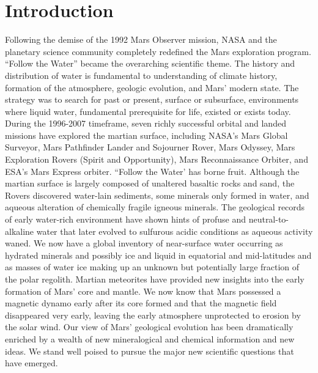 \chapter*{Introduction}

Following the demise of the 1992 Mars Observer mission,
NASA and the planetary science community completely redefined
the Mars exploration program. ``Follow the Water''
became the overarching scientific theme. The history and distribution
of water is fundamental to understanding of climate
history, formation of the atmosphere, geologic evolution, and
Mars' modern state. The strategy was to search for past or
present, surface or subsurface, environments where liquid
water, fundamental prerequisite for life, existed or exists today.
During the 1996-2007 timeframe, seven richly successful
orbital and landed missions have explored the martian surface,
including NASA's Mars Global Surveyor, Mars Pathfinder
Lander and Sojourner Rover, Mars Odyssey, Mars Exploration
Rovers (Spirit and Opportunity), Mars Reconnaissance Orbiter,
and ESA's Mars Express orbiter. ``Follow the Water' has borne
fruit. Although the martian surface is largely composed of unaltered
basaltic rocks and sand, the Rovers discovered water-lain
sediments, some minerals only formed in water, and aqueous
alteration of chemically fragile igneous minerals. The geological
records of early water-rich environment have shown hints
of profuse and neutral-to-alkaline water that later evolved to
sulfurous acidic conditions as aqueous activity waned. We now
have a global inventory of near-surface water occurring as
hydrated minerals and possibly ice and liquid in equatorial and
mid-latitudes and as masses of water ice making up an
unknown but potentially large fraction of the polar regolith.
Martian meteorites have provided new insights into the early
formation of Mars' core and mantle. We now know that Mars
possessed a magnetic dynamo early after its core formed and
that the magnetic field disappeared very early, leaving the early
atmosphere unprotected to erosion by the solar wind. Our view
of Mars' geological evolution has been dramatically enriched
by a wealth of new mineralogical and chemical information and
new ideas. We stand well poised to pursue the major new scientific
questions that have emerged.

